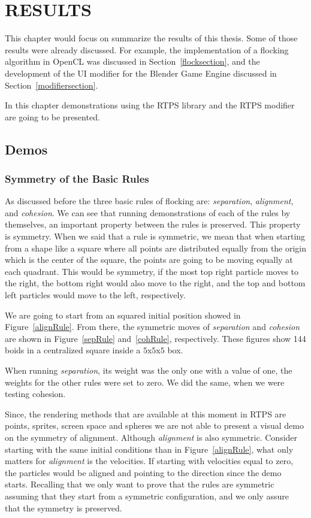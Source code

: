 \chapter{RESULTS}\label{resultsChapter}

This chapter would focus on summarize the results of this thesis. Some of those results were already discussed. For example, the implementation of a flocking algorithm in OpenCL was discussed in Section~\ref{flocksection}, and the development of the UI modifier for the Blender Game Engine discussed in Section~\ref{modifiersection}. 

In this chapter demonstrations using the RTPS library and the RTPS modifier are going to be presented.

\section{Demos}

\subsection{Symmetry of the Basic Rules}
As discussed before the three basic rules of flocking are: \textit{separation}, \textit{alignment}, and \textit{cohesion}. We can see that running demonstrations of each of the rules by themselves, an important property between the rules is preserved. This property is symmetry. When we said that a rule is symmetric, we mean that when starting from a shape like a square where all points are distributed equally from the origin which is the center of the square, the points are going to be moving equally at each quadrant. This would be symmetry, if the most top right particle moves to the right, the bottom right would also move to the right, and the top and bottom left particles would move to the left, respectively.

We are going to start from an squared initial position showed in Figure~\ref{alignRule}. From there, the symmetric moves of \textit{separation} and \textit{cohesion} are shown in Figure~\ref{sepRule} and~\ref{cohRule}, respectively. These figures show 144 boids in a centralized square inside a $5$x$5$x$5$ box.

When running \textit{separation}, its weight was the only one with a value of one, the weights for the other rules were set to zero. We did the same, when we were testing cohesion.

Since, the rendering methods that are available at this moment in RTPS are points, sprites, screen space and spheres we are not able to present a visual demo on the symmetry of alignment. Although \textit{alignment} is also symmetric. Consider starting with the same initial conditions than in Figure~\ref{alignRule}, what only matters for \textit{alignment} is the velocities. If starting with velocities equal to zero, the particles would be aligned and pointing to the direction since the demo starts. Recalling that we only want to prove that the rules are symmetric assuming that they start from a symmetric configuration, and we only assure that the symmetry is preserved.

